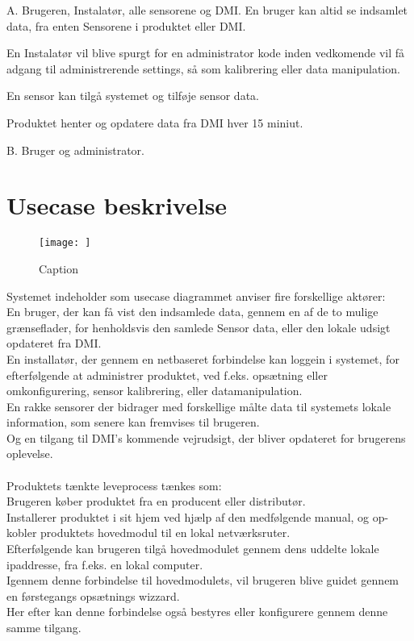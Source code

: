 A. Brugeren, Instalatør, alle sensorene og DMI.
En bruger kan altid se indsamlet data, fra enten Sensorene i produktet eller DMI.

En Instalatør vil blive spurgt for en administrator kode inden vedkomende vil få adgang til administrerende settings, så som kalibrering eller data manipulation.

En sensor kan tilgå systemet og tilføje sensor data.

Produktet henter og opdatere data fra DMI hver 15 miniut.

B. Bruger og administrator.


\section{Usecase beskrivelse}
\begin{figure}
    \centering
    \texttt{[image: ]}
    \caption{Caption}
    \label{fig:my_label}
\end{figure}
Systemet indeholder som usecase diagrammet anviser fire forskellige aktører:\\
En bruger, der kan få vist den indsamlede data, gennem en af de to mulige grænseflader, for henholdsvis den samlede Sensor data, eller den lokale udsigt opdateret fra DMI.\\
En installatør, der gennem en netbaseret forbindelse kan loggein i systemet, for efterfølgende at administrer produktet, ved f.eks. opsætning eller omkonfigurering, sensor kalibrering, eller datamanipulation.\\
En rakke sensorer der bidrager med forskellige målte data til systemets lokale information, som senere kan fremvises til brugeren.\\
Og en tilgang til DMI's kommende vejrudsigt, der bliver opdateret for brugerens oplevelse.
\\\\
\noindent
Produktets tænkte leveprocess tænkes som:\\
Brugeren køber produktet fra en producent eller distributør.\\
Installerer produktet i sit hjem ved hjælp af den medfølgende manual, og op-kobler produktets hovedmodul til en lokal netværksruter.\\
Efterfølgende kan brugeren tilgå hovedmodulet gennem dens uddelte lokale ipaddresse, fra f.eks. en lokal computer.\\
Igennem denne forbindelse til hovedmodulets, vil brugeren blive guidet gennem en førstegangs opsætnings wizzard.\\
Her efter kan denne forbindelse også bestyres eller konfigurere gennem denne samme tilgang.